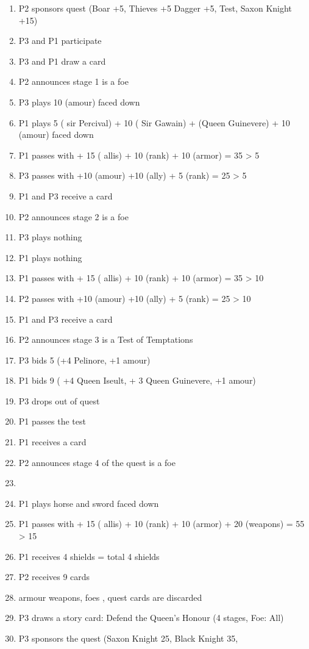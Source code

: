 \documentclass[a4paper,11pt]{article}
\begin{document}
\begin{enumerate}
\item P2 sponsors quest (Boar +5,  Thieves +5 Dagger +5,  Test,  Saxon Knight +15)
\item P3 and P1 participate
\item P3 and P1 draw a card
\item P2 announces stage 1 is a foe
\item P3 plays 10 (amour) faced down
\item P1 plays 5 ( sir Percival) + 10 ( Sir Gawain) + (Queen Guinevere) + 10 (amour) faced down
\item P1 passes with + 15 ( allis) + 10 (rank) + 10 (armor) = 35 > 5
\item P3 passes with +10 (amour) +10 (ally) + 5 (rank) = 25 > 5
\item P1 and P3 receive a card
\item P2 announces stage 2 is a foe
\item P3 plays nothing
\item P1 plays nothing
\item P1 passes with + 15 ( allis) + 10 (rank) + 10 (armor) = 35 > 10
\item P2 passes with +10 (amour) +10 (ally) + 5 (rank) = 25 > 10
\item P1 and P3 receive a card
\item P2 announces stage 3 is a Test of Temptations
\item P3 bids 5 (+4 Pelinore, +1 amour)
\item P1 bids 9 ( +4 Queen Iseult, + 3 Queen Guinevere, +1 amour) 
\item P3 drops out of quest
\item P1 passes the test
\item P1 receives a card
\item P2 announces stage 4 of the quest is a foe\item 
\item P1 plays horse and sword faced down
\item P1 passes with + 15 ( allis) + 10 (rank) + 10 (armor) + 20 (weapons) = 55 > 15
\item P1 receives 4 shields = total 4 shields
\item P2 receives 9 cards
\item armour weapons, foes , quest cards are discarded 
\item P3 draws a story card: Defend the Queen’s Honour (4 stages, Foe: All)
\item P3 sponsors the quest (Saxon Knight 25, Black Knight 35, 

\end{enumerate}
\end{document}
